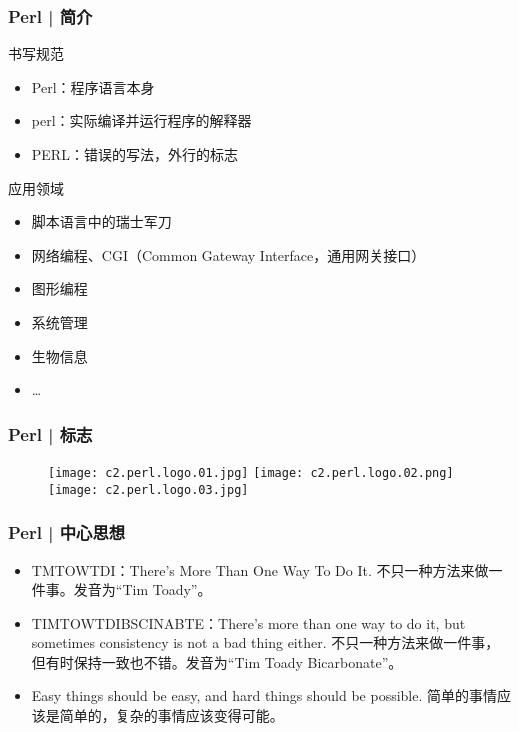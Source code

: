 \begin{frame}
  \frametitle{Perl | 简介}
  \begin{block}{\alert{书写规范}}
    \begin{itemize}
      \item Perl：程序语言本身
      \item perl：实际编译并运行程序的解释器
      \item PERL：错误的写法，外行的标志
    \end{itemize}
  \end{block}
  \pause
  \begin{block}{应用领域}
    \begin{itemize}
      \item 脚本语言中的瑞士军刀
      \item 网络编程、CGI（Common Gateway Interface，通用网关接口）
      \item 图形编程
      \item 系统管理
      \item 生物信息
      \item \ldots
    \end{itemize}
  \end{block}
\end{frame}

\begin{frame}
  \frametitle{Perl | 标志}
  \begin{figure}
    \centering
    \texttt{[image: c2.perl.logo.01.jpg]}
    \hspace{1cm}
    \texttt{[image: c2.perl.logo.02.png]}
    \vspace{0.5cm}
    \texttt{[image: c2.perl.logo.03.jpg]}
  \end{figure}
\end{frame}

\begin{frame}
  \frametitle{Perl | 中心思想}
  \begin{itemize}
    \item \alert{TMTOWTDI}：There's More Than One Way To Do It. 不只一种方法来做一件事。发音为“Tim Toady”。
    \item TIMTOWTDIBSCINABTE：There's more than one way to do it, but sometimes consistency is not a bad thing either.  不只一种方法来做一件事，但有时保持一致也不错。发音为“Tim Toady Bicarbonate”。
    \item Easy things should be easy, and hard things should be possible. 简单的事情应该是简单的，复杂的事情应该变得可能。
  \end{itemize}
\end{frame}

